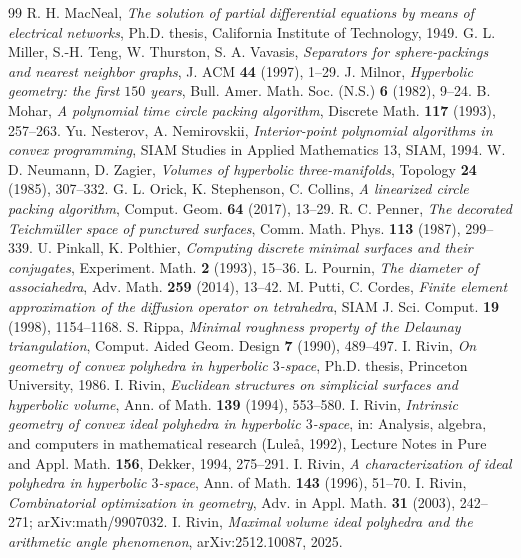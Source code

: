 \documentclass[11pt]{amsart}
\theoremstyle{definition}
\theoremstyle{remark}
\begin{document}
\begin{thebibliography}{99}
 R. H. MacNeal, \emph{The solution of partial differential equations by means of electrical networks}, Ph.D. thesis, California Institute of Technology, 1949.
 G. L. Miller, S.-H. Teng, W. Thurston, S. A. Vavasis, \emph{Separators for sphere-packings and nearest neighbor graphs}, J. ACM \textbf{44} (1997), 1--29.
 J. Milnor, \emph{Hyperbolic geometry: the first $150$ years}, Bull. Amer. Math. Soc. (N.S.) \textbf{6} (1982), 9--24.
 B. Mohar, \emph{A polynomial time circle packing algorithm}, Discrete Math. \textbf{117} (1993), 257--263.
 Yu. Nesterov, A. Nemirovskii, \emph{Interior-point polynomial algorithms in convex programming}, SIAM Studies in Applied Mathematics 13, SIAM, 1994.
 W. D. Neumann, D. Zagier, \emph{Volumes of hyperbolic three-manifolds}, Topology \textbf{24} (1985), 307--332.
 G. L. Orick, K. Stephenson, C. Collins, \emph{A linearized circle packing algorithm}, Comput. Geom. \textbf{64} (2017), 13--29.
 R. C. Penner, \emph{The decorated Teichm\"uller space of punctured surfaces}, Comm. Math. Phys. \textbf{113} (1987), 299--339.
 U. Pinkall, K. Polthier, \emph{Computing discrete minimal surfaces and their conjugates}, Experiment. Math. \textbf{2} (1993), 15--36.
 L. Pournin, \emph{The diameter of associahedra}, Adv. Math. \textbf{259} (2014), 13--42.
 M. Putti, C. Cordes, \emph{Finite element approximation of the diffusion operator on tetrahedra}, SIAM J. Sci. Comput. \textbf{19} (1998), 1154--1168.
 S. Rippa, \emph{Minimal roughness property of the Delaunay triangulation}, Comput. Aided Geom. Design \textbf{7} (1990), 489--497.
 I. Rivin, \emph{On geometry of convex polyhedra in hyperbolic $3$-space}, Ph.D. thesis, Princeton University, 1986.
 I. Rivin, \emph{Euclidean structures on simplicial surfaces and hyperbolic volume}, Ann. of Math. \textbf{139} (1994), 553--580.
 I. Rivin, \emph{Intrinsic geometry of convex ideal polyhedra in hyperbolic $3$-space}, in: Analysis, algebra, and computers in mathematical research (Lule\aa, 1992), Lecture Notes in Pure and Appl. Math. \textbf{156}, Dekker, 1994, 275--291.
 I. Rivin, \emph{A characterization of ideal polyhedra in hyperbolic $3$-space}, Ann. of Math. \textbf{143} (1996), 51--70.
 I. Rivin, \emph{Combinatorial optimization in geometry}, Adv. in Appl. Math. \textbf{31} (2003), 242--271; arXiv:math/9907032.
 I. Rivin, \emph{Maximal volume ideal polyhedra and the arithmetic angle phenomenon}, arXiv:2512.10087, 2025.

\end{thebibliography}
\end{document}
